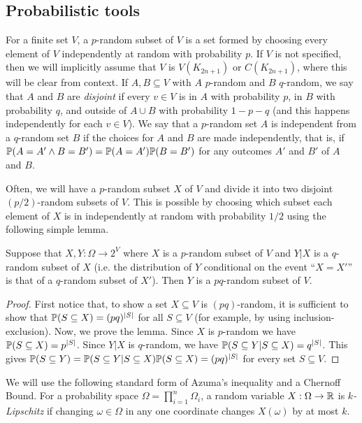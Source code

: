 \subsection{Probabilistic tools}\label{sec:prob}
For a finite set $V$, a $p$-random subset of $V$ is a set formed by choosing every element of $V$ independently  at random with probability $p$. If $V$ is not specified, then we will implicitly assume that $V$ is $V(K_{2n+1})$ or $C(K_{2n+1})$, where this will be clear from context. 
If $A,B\subseteq V$ with $A$ $p$-random and $B$ $q$-random, we say that $A$ and $B$ are \emph{disjoint} if every $v\in V$ is in $A$ with probability $p$, in $B$ with probability $q$, and outside of $A\cup B$ with probability $1-p-q$ (and this happens independently for each $v\in V$). We say that a $p$-random set $A$ is independent from a $q$-random set $B$ if the choices for $A$ and $B$ are made independently, that is, if $\P(A=A'\land B=B')=\P(A=A')\P(B=B')$ for any outcomes $A'$ and $B'$ of $A$ and $B$.

Often, we will have a $p$-random subset $X$ of $V$ and divide  it into two disjoint $(p/2)$-random subsets of $V$. This is possible by choosing which subset each element of $X$ is in independently at random with probability $1/2$ using the following simple lemma.
\begin{lemma}\label{Lemma_mixture_of_p_random_sets}
Suppose that $X,Y:\Omega\to 2^V$ where $X$ is a $p$-random subset of $V$ and $Y|X$ is a $q$-random subset of $X$ (i.e. the distribution of $Y$ conditional on the event ``$X=X'$'' is that of a $q$-random subset of $X'$). Then $Y$ is a $pq$-random subset of $V$.
\end{lemma}
\begin{proof}
First notice that, to show a set $X\subseteq V$ is $(pq)$-random, it is sufficient to show that  $\P(S\subseteq X)=(pq)^{|S|}$ for all $S\subseteq V$ (for example, by using inclusion-exclusion).
Now, we prove the lemma.
Since $X$ is $p$-random we have $\P(S\subseteq X)=p^{|S|}$. Since $Y|X$ is $q$-random, we have $\P(S\subseteq Y|S\subseteq X)=q^{|S|}$. This gives $\P(S\subseteq Y)= \P(S\subseteq Y|S\subseteq X)\P(S\subseteq X)=(pq)^{|S|}$ for every set $S\subseteq V$.
\end{proof}

We will use the following standard form of Azuma's inequality and a Chernoff Bound. For a probability space $\Omega=\prod_{i=1}^n \Omega_i$, a random variable $X:\Omega\to \R$ is \emph{$k$-Lipschitz} if changing $\omega\in \Omega$ in any one coordinate changes $X(\omega)$ by at most $k$.


